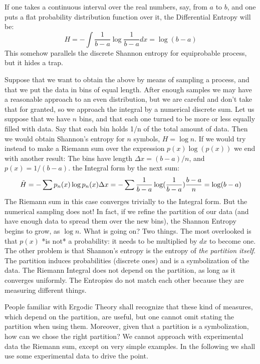\documentclass{article}
\begin{document}
If one takes a continuous interval over the real numbers, say, from $a$ to $b$, and one puts a flat probability distribution function over it, the Differential Entropy will be:
$$
H=-\int \frac{1}{b-a} \log \frac{1}{b-a} d x = \log (b-a)
$$
This somehow parallels the discrete Shannon entropy for equiprobable process, but it hides a trap.

Suppose that we want to obtain the above by means of sampling a process, and that we put the data in bins of
equal length. After enough samples we may have a reasonable approach to an even distribution, but we are careful
and don't take that for granted, so we approach the integral by a numerical discrete sum. Let us suppose that we have $n$ bins, and that each one turned to be more or less equally filled with data. Say that each bin holds 1/n of the total amount of data. Then we would obtain Shannon's entropy for $n$ symbols, $H=\log n$. If we would try instead to make a Riemann sum over the expression $ p(x) \log (p(x))$ we end with another result: The bins have length $\Delta x= (b-a)/n$, and $p(x)=1/(b-a)$. 
the Integral form by the next sum:
$$
\tilde{H}=-\sum p_n(x) \log p_n(x) \Delta x \\
=-\sum \frac{1}{b-a}\log (\frac{1}{b-a}) \frac{b-a}{n} \\
= \log (b-a)
$$
The Riemann sum in this case converges trivially to the Integral form. But the numerical sampling does not! In fact, if we refine the partition of our data (and have enough data to spread them over the new bins), the Shannon Entropy begins to grow, as $\log n$. What is going on? Two things. The most overlooked is that $p(x)$ *is not* a probability: it needs to be multiplied by $dx$ to become one. The other problem is that  Shannon's entropy is the entropy of \emph{the partition itself}. The partition induces probabilities (discrete ones) and is a symbolization of the data. The Riemann Integral does not depend on the partition, as long as it converges uniformly. The Entropies do not match each other because they are measuring different things.

People familiar with Ergodic Theory shall recognize that these kind of measures, which depend on the partition, are useful, but one cannot omit stating the partition when using them. Moreover, given that a partition is a symbolization, how can we chose the right partition? We cannot approach with experimental data the Riemann sum, except on very simple examples. 
In the following we shall use some experimental data
to drive the point.
\end{document}
